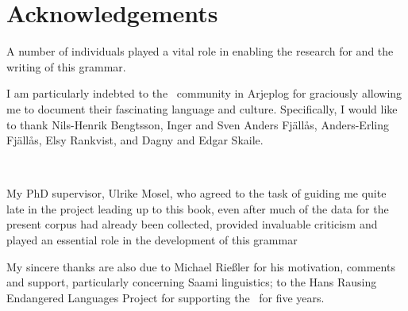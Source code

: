 %



\chapter*{Acknowledgements}\label{acknowledgements}\hypertarget{acknowledgements}{}


A number of individuals played a vital role in enabling the research for and the writing of this grammar. 

\vspace{10pt}
I am particularly indebted to the \PS\ community in Arjeplog for graciously allowing me to document their fascinating language and culture. %
Specifically, I would like to thank Nils-Henrik Bengtsson, Inger and Sven Anders Fjällås, Anders-Erling Fjällås, Elsy Rankvist, and Dagny and Edgar Skaile. 

{\centering{}\\}
\vspace{10pt}

My PhD supervisor, Ulrike Mosel, who agreed to the task of guiding me quite late in the project leading up to this book, even after much of the data for the present corpus had already been collected, provided invaluable criticism and played an essential role in the development of this grammar \textendash\  %

My sincere thanks are also due %
to Michael Rießler for his motivation, comments and support, particularly concerning Saami linguistics; 
to the Hans Rausing Endangered Languages Project for supporting the \PSDP\ for five years. %

